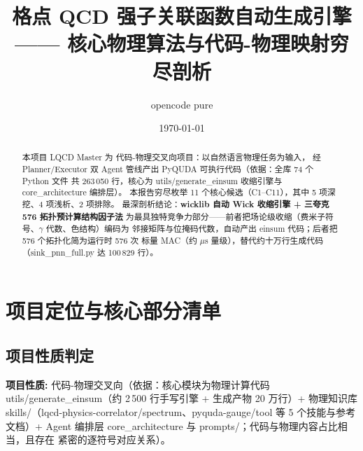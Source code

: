 \documentclass[UTF8]{ctexart}
\title{格点 QCD 强子关联函数自动生成引擎 —— 核心物理算法与代码-物理映射穷尽剖析}
\author{opencode pure}
\date{\today}
\begin{document}
\maketitle

\begin{abstract}
本项目 LQCD Master 为 \textcolor{phys}{代码-物理交叉向}项目：以自然语言物理任务为输入，
经 Planner/Executor 双 Agent 管线产出 PyQUDA 可执行代码（依据：全库 74 个 Python 文件
共 263\,050 行，核心为 utils/generate\_einsum 收缩引擎与 core\_architecture 编排层）。
本报告穷尽枚举 11 个核心候选（C1--C11），其中 5 项深挖、4 项浅析、2 项排除。
最深剖析结论：\textbf{wicklib 自动 Wick 收缩引擎 + 三夸克 576 拓扑预计算结构因子法}
为最具独特竞争力部分——前者把场论级收缩（费米子符号、$\gamma$ 代数、色结构）编码为
邻接矩阵与位掩码代数，自动产出 einsum 代码；后者把 576 个拓扑化简为运行时 576 次
标量 MAC（约 $\mu$s 量级），替代约十万行生成代码（sink\_pnn\_full.py 达 100\,829 行）。
\end{abstract}

\tableofcontents

\section{项目定位与核心部分清单}
\subsection{项目性质判定}
\begin{keybox}
\textbf{项目性质:} \textcolor{phys}{代码-物理交叉向}（依据：核心模块为物理计算代码
utils/generate\_einsum（约 2\,500 行手写引擎 + 生成产物 20 万行）+ 物理知识库
skills/（lqcd-physics-correlator/spectrum、pyquda-gauge/tool 等 5 个技能与参考文档）+
Agent 编排层 core\_architecture 与 prompts/；代码与物理内容占比相当，且存在
紧密的逐符号对应关系）。
\end{keybox}
\end{document}

